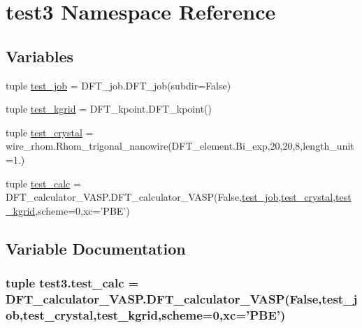 \hypertarget{namespacetest3}{\section{test3 Namespace Reference}
\label{namespacetest3}
}
\subsection*{Variables}
\begin{DoxyCompactItemize}
\item 
tuple \hyperlink{namespacetest3_a0d36fc96483a4543e1473d3c1253346e}{test\+\_\+job} = D\+F\+T\+\_\+job.\+D\+F\+T\+\_\+job(subdir=False)
\item 
tuple \hyperlink{namespacetest3_a317c841e10b9ca6fc53f8af033d8070d}{test\+\_\+kgrid} = D\+F\+T\+\_\+kpoint.\+D\+F\+T\+\_\+kpoint()
\item 
tuple \hyperlink{namespacetest3_abb0fd19d3a9690b2ad72da60814ee612}{test\+\_\+crystal} = wire\+\_\+rhom.\+Rhom\+\_\+trigonal\+\_\+nanowire(D\+F\+T\+\_\+element.\+Bi\+\_\+exp,20,20,8,length\+\_\+unit=1.)
\item 
tuple \hyperlink{namespacetest3_a6501ad4a36cdf53fc9c99818c0f00e6c}{test\+\_\+calc} = D\+F\+T\+\_\+calculator\+\_\+\+V\+A\+S\+P.\+D\+F\+T\+\_\+calculator\+\_\+\+V\+A\+S\+P(False,\hyperlink{namespacetest3_a0d36fc96483a4543e1473d3c1253346e}{test\+\_\+job},\hyperlink{namespacetest3_abb0fd19d3a9690b2ad72da60814ee612}{test\+\_\+crystal},\hyperlink{namespacetest3_a317c841e10b9ca6fc53f8af033d8070d}{test\+\_\+kgrid},scheme=0,xc='P\+B\+E')
\end{DoxyCompactItemize}


\subsection{Variable Documentation}
\hypertarget{namespacetest3_a6501ad4a36cdf53fc9c99818c0f00e6c}{
\subsubsection[{test\+\_\+calc}]{\setlength{\rightskip}{0pt plus 5cm}tuple test3.\+test\+\_\+calc = D\+F\+T\+\_\+calculator\+\_\+\+V\+A\+S\+P.\+D\+F\+T\+\_\+calculator\+\_\+\+V\+A\+S\+P(False,{\bf test\+\_\+job},{\bf test\+\_\+crystal},{\bf test\+\_\+kgrid},scheme=0,xc='P\+B\+E')}}\label{namespacetest3_a6501ad4a36cdf53fc9c99818c0f00e6c}


